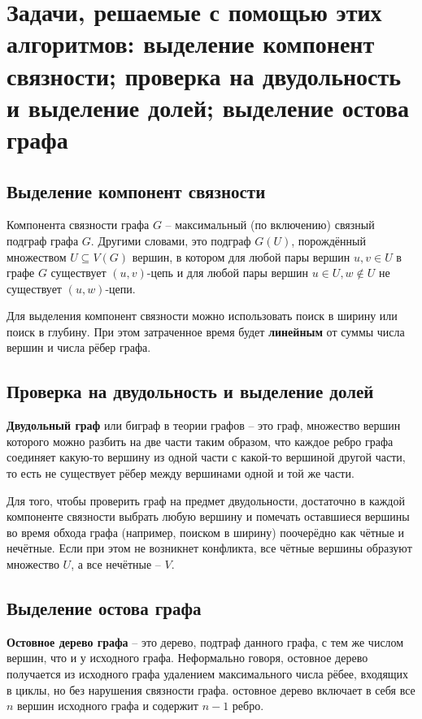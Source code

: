 \documentclass[40pt]{article}
\begin{document}
\section{Задачи, решаемые с помощью этих алгоритмов: выделение компонент связности; проверка на двудольность и выделение долей; выделение остова графа}

\subsection{Выделение компонент связности}

Компонента связности графа $G$ -- максимальный (по включению) связный подграф графа $G$. Другими словами, это подграф $G(U)$, порождённый множеством $U \subseteq V(G)$ вершин, в котором для любой пары вершин $u, v \in U$ в графе $G$ существует $(u, v)$-цепь и для любой пары вершин $u \in U, w \notin U$ не существует $(u, w)$-цепи.

Для выделения компонент связности можно использовать поиск в ширину или поиск в глубину. При этом затраченное время будет \textbf{линейным} от суммы числа вершин и числа рёбер графа.

\subsection{Проверка на двудольность и выделение долей}

\textbf{Двудольный граф} или биграф в теории графов -- это граф, множество вершин которого можно разбить на две части таким образом, что каждое ребро графа соединяет какую-то вершину из одной части с какой-то вершиной другой части, то есть не существует рёбер между вершинами одной и той же части.

Для того, чтобы проверить граф на предмет двудольности, достаточно в каждой компоненте связности выбрать любую вершину и помечать оставшиеся вершины во время обхода графа (например, поиском в ширину) поочерёдно как чётные и нечётные. Если при этом не возникнет конфликта, все чётные вершины образуют множество $U$, а все нечётные -- $V$.

\subsection{Выделение остова графа}

\textbf{Остовное дерево графа} -- это дерево, подтраф данного графа, с тем же числом вершин, что и у исходного графа. Неформально говоря, остовное дерево получается из исходного графа удалением максимального числа рёбее, входящих в циклы, но без нарушения связности графа. остовное дерево включает в себя все $n$ вершин исходного графа и содержит $n-1$ ребро.
\end{document}
